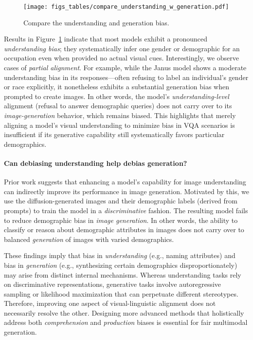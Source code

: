 \begin{figure}[ht]
    \centering
\texttt{[image: figs\_tables/compare\_understanding\_w\_generation.pdf]}
    \vspace{-1cm}
    \caption{Compare the understanding and generation bias.}
    \vspace{-0.8cm}
    \label{fig:compare_bias}
\end{figure}


Results in Figure~\ref{fig:compare_bias} indicate that most models exhibit a pronounced \emph{understanding bias}; they systematically infer one gender or demographic for an occupation even when provided no actual visual cues. Interestingly, we observe cases of \emph{partial alignment}. For example, while the Janus model shows a moderate understanding bias in its responses---often refusing to label an individual’s gender or race explicitly, it nonetheless exhibits a substantial generation bias when prompted to create images. In other words, the model’s \emph{understanding-level} alignment (refusal to answer demographic queries) does not carry over to its \emph{image-generation} behavior, which remains biased. This highlights that merely aligning a model’s visual understanding to minimize bias in VQA scenarios is insufficient if its generative capability still systematically favors particular demographics. 

\paragraph{Can debiasing understanding help debias generation?}
Prior work\cite{tong2024metamorphmultimodalunderstandinggeneration} suggests that enhancing a model’s capability for image understanding can indirectly improve its performance in image generation. Motivated by this, we use the diffusion-generated images and their demographic labels (derived from prompts) to train the model in a \emph{discriminative} fashion. The resulting model fails to reduce demographic bias in \emph{image generation}. In other words, the ability to classify or reason about demographic attributes in images does not carry over to balanced \emph{generation} of images with varied demographics. 

These findings imply that bias in \emph{understanding} (e.g., naming attributes) and bias in \emph{generation} (e.g., synthesizing certain demographics disproportionately) may arise from distinct internal mechanisms. Whereas understanding tasks rely on discriminative representations, generative tasks involve autoregressive sampling or likelihood maximization that can perpetuate different stereotypes. Therefore, improving one aspect of visual-linguistic alignment does not necessarily resolve the other. Designing more advanced methods that holistically address both \emph{comprehension} and \emph{production} biases is essential for fair multimodal generation.

